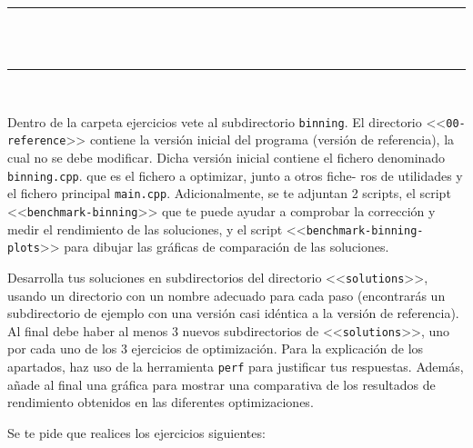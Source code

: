 
\begin{center}
	\rule{15cm}{0pt} \\
	{\fboxrule=4pt } \\
	\setcounter{chapter}{3}
	\setcounter{section}{0}
	\rule{15cm}{0pt} \\
\end{center}
\begin{ejer}
	\par Dentro de la carpeta ejercicios vete al subdirectorio \texttt{binning}. El directorio <<\texttt{00-reference}>> 
	contiene la versión inicial del programa (versión de referencia), la cual no se debe modificar. Dicha versión
	inicial contiene el fichero denominado \texttt{binning.cpp}. que es el fichero a optimizar, junto a otros fiche-
	ros de utilidades y el fichero principal \texttt{main.cpp}. Adicionalmente, se te adjuntan 2 scripts, el script
	<<\texttt{benchmark-binning}>> que te puede ayudar a comprobar la corrección y medir el rendimiento de las
	soluciones, y el script <<\texttt{benchmark-binning-plots}>> para dibujar las gráficas de comparación de las
	soluciones.
	\par Desarrolla tus soluciones en subdirectorios del directorio <<\texttt{solutions}>>, usando un directorio con un
	nombre adecuado para cada paso (encontrarás un subdirectorio de ejemplo con una versión casi idéntica
	a la versión de referencia). Al final debe haber al menos 3 nuevos subdirectorios de <<\texttt{solutions}>>, uno
	por cada uno de los 3 ejercicios de optimización.
	Para la explicación de los apartados, haz uso de la herramienta \texttt{perf} para justificar tus
	respuestas. Además, añade al final una gráfica para mostrar una comparativa de
	los resultados de rendimiento obtenidos en las diferentes optimizaciones.
	\par Se te pide que realices los ejercicios siguientes:
\end{ejer}

\newpage

\newpage

\newpage

\newpage

\newpage
